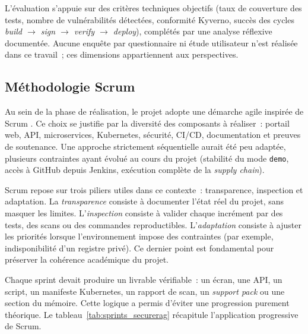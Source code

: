 L'évaluation s'appuie sur des critères techniques objectifs (taux de couverture des tests, nombre de vulnérabilités détectées, conformité Kyverno, succès des cycles \textit{build $\rightarrow$ sign $\rightarrow$ verify $\rightarrow$ deploy}), complétés par une analyse réflexive documentée. Aucune enquête par questionnaire ni étude utilisateur n'est réalisée dans ce travail~; ces dimensions appartiennent aux perspectives.

\subsection{Méthodologie Scrum}

Au sein de la phase de réalisation, le projet adopte une démarche agile inspirée de Scrum \cite{schwaber_scrum_guide}. Ce choix se justifie par la diversité des composants à réaliser~: portail web, API, microservices, Kubernetes, sécurité, CI/CD, documentation et preuves de soutenance. Une approche strictement séquentielle aurait été peu adaptée, plusieurs contraintes ayant évolué au cours du projet (stabilité du mode \texttt{demo}, accès à GitHub depuis Jenkins, exécution complète de la \textit{supply chain}).

Scrum repose sur trois piliers utiles dans ce contexte~: transparence, inspection et adaptation. La \textit{transparence} consiste à documenter l'état réel du projet, sans masquer les limites. L'\textit{inspection} consiste à valider chaque incrément par des tests, des scans ou des commandes reproductibles. L'\textit{adaptation} consiste à ajuster les priorités lorsque l'environnement impose des contraintes (par exemple, indisponibilité d'un registre privé). Ce dernier point est fondamental pour préserver la cohérence académique du projet.

Chaque sprint devait produire un livrable vérifiable~: un écran, une API, un script, un manifeste Kubernetes, un rapport de scan, un \textit{support pack} ou une section du mémoire. Cette logique a permis d'éviter une progression purement théorique. Le tableau~\ref{tab:sprints_securerag} récapitule l'application progressive de Scrum.

